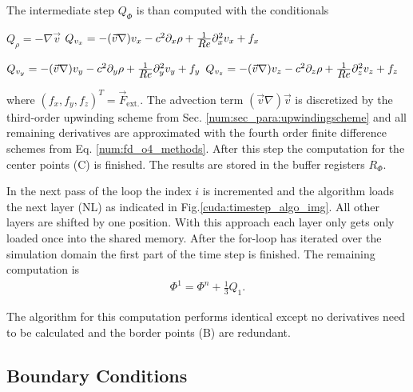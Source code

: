 The intermediate step $Q_{\Phi}$ is than computed with the conditionals
\begin{center}
 \begin{minipage}{.55\linewidth}
\begin{algorithmic}
      \STATE ${Q_{\rho} = -\nabla \vec{v}}$
\ENDIF
{}
      \STATE ${Q_{v_x} = -(\vec{v} \nabla) v_x - c^2\partial_x\rho + \frac{1}{\mbox{\textit{Re}}}\partial^2_xv_x + f_x}$
\ENDIF
\end{algorithmic}
 \end{minipage}

\clearpage

 \begin{minipage}{.55\linewidth}
\begin{algorithmic}
      \STATE ${Q_{v_y} = -(\vec{v} \nabla) v_y - c^2\partial_y\rho + \frac{1}{\mbox{\textit{Re}}}\partial^2_yv_y + f_y}$
\ENDIF
{}
      \STATE ${Q_{v_z} = -(\vec{v} \nabla) v_z - c^2\partial_z\rho + \frac{1}{\mbox{\textit{Re}}}\partial^2_zv_z + f_z}$
\ENDIF
\end{algorithmic}
 \end{minipage}
\end{center}

where $(f_x, f_y, f_z)^T = \vec{F}_{\text{ext.}}$. The advection term $(\vec{v}\nabla)\vec{v}$ is discretized by the third-order upwinding scheme from Sec. \ref{num:sec_para:upwindingscheme}
and all remaining derivatives are approximated with the fourth order finite difference schemes from Eq. \ref{num:fd_o4_methods}.
After this step the computation for the center points (C) is finished.
The results are stored in the buffer registers $R_\Phi$.

In the next pass of the loop the index $i$ is incremented and the algorithm loads the next layer (NL) as indicated in Fig.\ref{cuda:timestep_algo_img}.
All other layers are shifted by one position. With this approach each layer only gets only loaded once into the shared memory.
After the for-loop has iterated over the simulation domain the first part of the time step is finished.
The remaining computation is
\begin{align}
     \Phi^{1} = \Phi^n + \frac{1}{3}Q_1.
\end{align}

The algorithm for this computation performs identical except no derivatives need to be calculated and
the border points (B) are redundant.

\subsection{Boundary Conditions}
\label{sec:cuda_boundaries}


